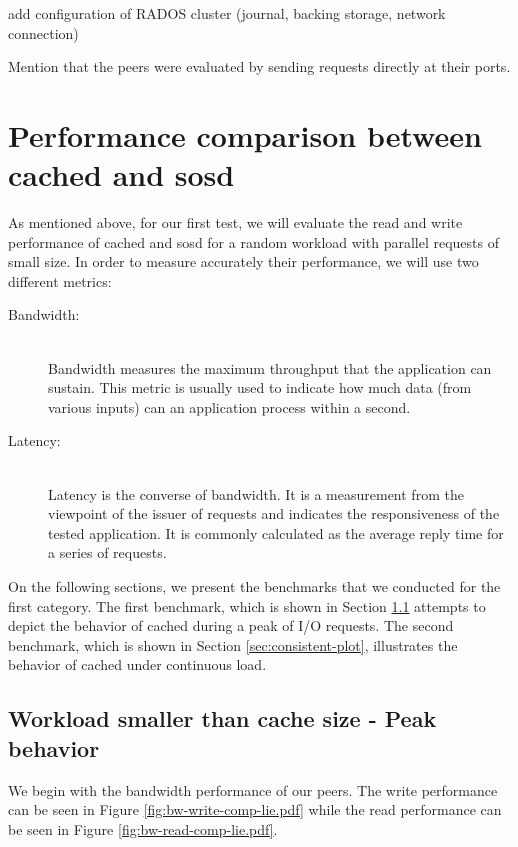 \todo add configuration of RADOS cluster (journal, backing storage, network 
connection)

\fixme Mention that the peers were evaluated by sending requests directly at 
their ports.

\section{Performance comparison between cached and sosd}
\label{sec:perf-plot}

As mentioned above, for our first test, we will evaluate the read and write 
performance of cached and sosd for a random workload with parallel requests of 
small size. In order to measure accurately their performance, we will use two 
different metrics:

\begin{description}
	\item[Bandwidth:] \hfill \\
		Bandwidth measures the maximum throughput that the application 
		can sustain. This metric is usually used to indicate how much 
		data (from various inputs) can an application process within a 
		second.
	\item[Latency:] \hfill \\
		Latency is the converse of bandwidth. It is a measurement from 
		the viewpoint of the issuer of requests and indicates the 
		responsiveness of the tested application. It is commonly 
		calculated as the average reply time for a series of requests.
\end{description}

On the following sections, we present the benchmarks that we conducted for the 
first category. The first benchmark, which is shown in Section 
\ref{sec:peak-plot} attempts to depict the behavior of cached during a peak of 
I/O requests. The second benchmark, which is shown in Section 
\ref{sec:consistent-plot}, illustrates the behavior of cached under continuous 
load.

\subsection{Workload smaller than cache size - Peak behavior}
\label{sec:peak-plot}

We begin with the bandwidth performance of our peers. The write performance can 
be seen in Figure \ref{fig:bw-write-comp-lie.pdf} while the read performance 
can be seen in Figure \ref{fig:bw-read-comp-lie.pdf}.

